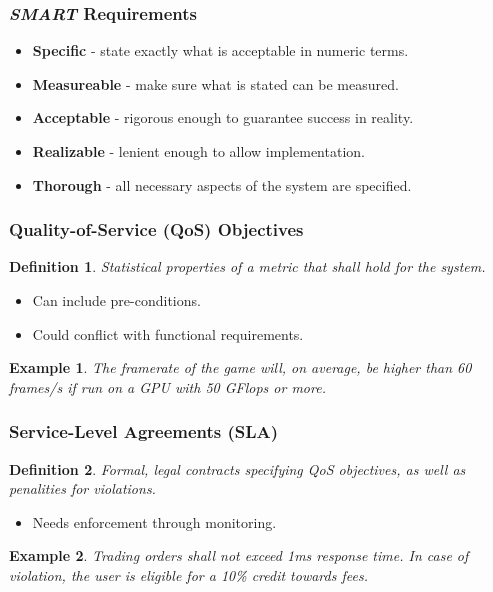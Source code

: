 \documentclass[11pt]{article}
\newtheorem{defn}{Definition}
\newtheorem{eg}{Example}
\begin{document}
\subsubsection{\textit{SMART} Requirements}
\begin{itemize}
  \item \textbf{Specific} - state exactly what is acceptable in numeric terms.
  \item \textbf{Measureable} - make sure what is stated can be measured.
  \item \textbf{Acceptable} - rigorous enough to guarantee success in reality.
  \item \textbf{Realizable} - lenient enough to allow implementation.
  \item \textbf{Thorough} - all necessary aspects of the system are specified.
\end{itemize}

\subsubsection{Quality-of-Service (QoS) Objectives}
\begin{defn}
  Statistical properties of a metric that shall hold for the system.
\end{defn}
\begin{itemize}
  \item Can include pre-conditions.
  \item Could conflict with functional requirements.
\end{itemize}

\begin{eg}
  The framerate of the game will, on average, be higher than 60 frames/s if run on a GPU with 50 GFlops or more.
\end{eg}

\subsubsection{Service-Level Agreements (SLA)}
\begin{defn}
  Formal, legal contracts specifying QoS objectives, as well as penalities for violations.
\end{defn}
\begin{itemize}
  \item Needs enforcement through monitoring.
\end{itemize}

\begin{eg}
  Trading orders shall not exceed 1ms response time. 
  In case of violation, the user is eligible for a 10\% credit towards fees.
\end{eg}
\end{document}
